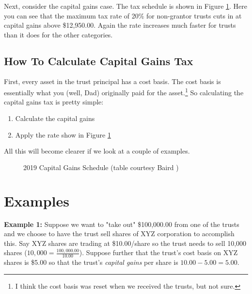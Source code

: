 \documentclass[11pt, oneside]{article}   	%
\theoremstyle{definition}
\begin{document}
\bigskip
\noindent
Next, consider the capital gains case. The tax schedule is shown in Figure \ref{fig:2019_capital_gains_schedule}.
Here you can see that the maximum tax rate of 20\% for non-grantor trusts cuts in at capital gains above \$12,950.00. 
Again the rate increases much faster for trusts than it does for the other categories. 

\subsection{How To Calculate Capital Gains Tax}
First, every asset in the trust principal has a cost basis. The cost basis is essentially
what you (well, Dad) originally paid for the asset.\footnote{I think the cost basis was reset when we received the trusts, but not sure.}
So calculating the capital gains tax is pretty simple:
\begin{enumerate}
\item Calculate the capital gains
\item Apply the rate show in Figure \ref{fig:2019_capital_gains_schedule}
\end{enumerate}

\bigskip
\noindent
All this will become clearer if we look at a couple of examples.


\begin{figure}
\caption{2019 Capital Gains Schedule (table courtesy Baird \cite{baird2019})}
\label{fig:2019_capital_gains_schedule}
\end{figure}

\section{Examples}
\label{sec:examples}
\textbf{Example 1:}  Suppose we want to "take out" \$100,000.00 from one of the trusts and we choose to have the trust sell shares of XYZ corporation
to accomplish this. Say XYZ shares are trading at \$10.00/share so the trust needs to sell 10,000 shares ($10,000 =  \frac{100,000.00}{10.00}$).
Suppose further that the trust's  cost basis on XYZ shares is \$5.00 so that the trust's \emph{capital gains} per share is $10.00 - 5.00 = 5.00$. 
\end{document}

